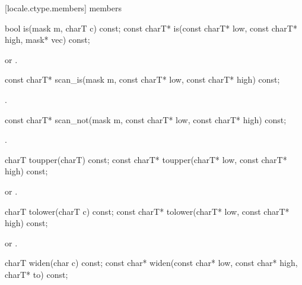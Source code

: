 [locale.ctype.members]{ members}

%
\begin{itemdecl}
bool         is(mask m, charT c) const;
const charT* is(const charT* low, const charT* high, mask* vec) const;
\end{itemdecl}

\begin{itemdescr}
\pnum
\returns
{}
or
.
\end{itemdescr}

%
\begin{itemdecl}
const charT* scan_is(mask m, const charT* low, const charT* high) const;
\end{itemdecl}

\begin{itemdescr}
\pnum
\returns
{}.
\end{itemdescr}

%
\begin{itemdecl}
const charT* scan_not(mask m, const charT* low, const charT* high) const;
\end{itemdecl}

\begin{itemdescr}
\pnum
\returns
{}.
\end{itemdescr}

%
\begin{itemdecl}
charT        toupper(charT) const;
const charT* toupper(charT* low, const charT* high) const;
\end{itemdecl}

\begin{itemdescr}
\pnum
\returns
{}
or
.
\end{itemdescr}

%
\begin{itemdecl}
charT        tolower(charT c) const;
const charT* tolower(charT* low, const charT* high) const;
\end{itemdecl}

\begin{itemdescr}
\pnum
\returns
{}
or
.
\end{itemdescr}

%
\begin{itemdecl}
charT       widen(char c) const;
const char* widen(const char* low, const char* high, charT* to) const;
\end{itemdecl}

